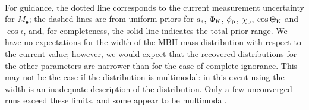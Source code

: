 \begin{figure}[!htp]
\setcounter{subfigure}{18}
\begin{center}
 \quad
{} \\
\end{center}
\setcounter{subfigure}{0}
\end{figure}
For guidance, the dotted line corresponds to the current measurement uncertainty for $M_\bullet$; the dashed lines are from uniform priors for $a_\ast$, $\Phi_\mathrm{K}$, $\phi_\mathrm{p}$, $\chi_\mathrm{p}$, $\cos\Theta_\mathrm{K}$ and $\cos\iota$, and, for completeness, the solid line indicates the total prior range. We have no expectations for the width of the MBH mass distribution with respect to the current value; however, we would expect that the recovered distributions for the other parameters are narrower than for the case of complete ignorance. This may not be the case if the distribution is multimodal: in this event using the width is an inadequate description of the distribution. Only a few unconverged runs exceed these limits, and some appear to be multimodal.

